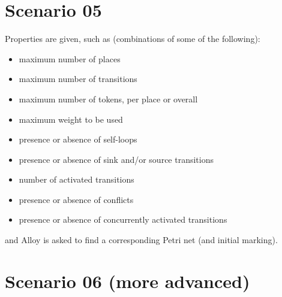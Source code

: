 \documentclass{article}
\begin{document}
\pagebreak

\section*{Scenario 05}

Properties are given, such as (combinations of some of the following):
\begin{itemize}
\item
  maximum number of places
\item
  maximum number of transitions
\item
  maximum number of tokens, per place or overall 
\item
  maximum weight to be used
\item
  presence or absence of self-loops
\item
  presence or absence of sink and/or source transitions
\item
  number of activated transitions
\item
  presence or absence of conflicts
\item
  presence or absence of concurrently activated transitions
\end{itemize}
and Alloy is asked to find a corresponding Petri net (and initial marking).

\pagebreak

\section*{Scenario 06 (more advanced)}
\end{document}
